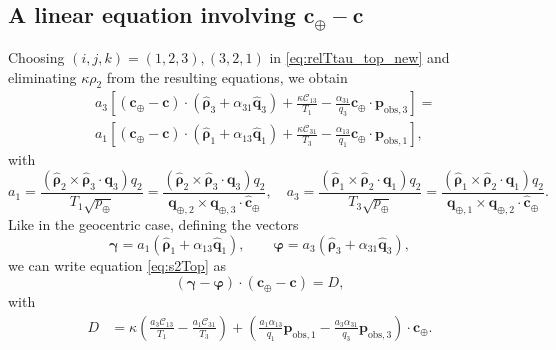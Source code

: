 \documentclass[11pt]{article}
\def\angmom{\bm{c}}
\def\angmom{{\bm{c}}}
\begin{document}
\subsection{A linear equation involving $\angmom_\oplus-\angmom$}

Choosing $(i,j,k)=(1,2,3), (3,2,1)$ in \eqref{eq:relTtau_top_new} and eliminating $\kappa\rho_2$ from the resulting equations, we obtain
\begin{equation}\label{eq:s2Top}
    \begin{aligned}
        & a_3 \left[\left(\bm{c}_\oplus-\bm{c}\right)\cdot
        \left(\hat{\bm{\rho}}_3
        +\alpha_{31}\hat{\bm{q}}_3\right) + \frac{\kappa\mathcal{C}_{13} 
        }{T_1}
        -\frac{\alpha_{31}}{q_3}\bm{c}_\oplus\cdot\bm{p}_{\text{obs},3}
        \right]
        =\\
        & a_1\left[(\bm{c}_\oplus-\bm{c})\cdot
        \left(\hat{\bm{\rho}}_1
        +\alpha_{13}\hat{\bm{q}}_1\right) + \frac{\kappa\mathcal{C}_{31}}{T_3}
        -\frac{\alpha_{13}}{q_1}\bm{c}_\oplus\cdot\bm{p}_{\text{obs},1}
        \right],
    \end{aligned}
\end{equation}
with
\begin{equation}
    a_{1} = \frac{\left(
    \hat{\bm{\rho}}_2\times\hat{\bm{\rho}}_3 \cdot\bm{q}_3
    \right){q}_2}{T_1\sqrt{p_\oplus}}
    = 
    \frac{\left(
    \hat{\bm{\rho}}_2\times\hat{\bm{\rho}}_3 \cdot\bm{q}_3
    \right){q}_2}{\bm{q}_{\oplus,2}\times\bm{q}_{\oplus,3} \cdot\hat{\bm{c}}_\oplus}
    , \quad
    a_{3} = \frac{\left(
    \hat{\bm{\rho}}_1\times\hat{\bm{\rho}}_2 \cdot\bm{q}_1
    \right){q}_2}{T_3\sqrt{p_\oplus}}
    = \frac{\left(
    \hat{\bm{\rho}}_1\times\hat{\bm{\rho}}_2 \cdot\bm{q}_1
    \right){q}_2}{\bm{q}_{\oplus,1}\times\bm{q}_{\oplus,2} \cdot\hat{\bm{c}}_\oplus}.
\label{eq:ajtop}
\end{equation}
%
Like in the geocentric case, defining the vectors
%
\begin{equation*}
    \bm{\gamma} = a_{1}\left(\hat{\bm{\rho}}_1 + \alpha_{13}\hat{\bm{q}}_1\right),\qquad
    \bm{\varphi} = a_{3}\left(\hat{\bm{\rho}}_3 + \alpha_{31}\hat{\bm{q}}_3\right),
\end{equation*}
%
we can write equation \eqref{eq:s2Top} as
%
\begin{equation}\label{eq:slintop}
    (\bm{\gamma}-\bm{\varphi})\cdot\left(\bm{c}_\oplus-\bm{c}\right) = D,
\end{equation}
with
\begin{equation*}
\begin{aligned}
    D &= \kappa\left(\frac{a_3\mathcal{C}_{13}}{T_1} - \frac{a_1\mathcal{C}_{31}}{T_3}\right)
    +\left(
    \frac{a_1\alpha_{13}}{q_1}\bm{p}_{\text{obs},1} 
    -
     \frac{a_3\alpha_{31}}{q_3}\bm{p}_{\text{obs},3} 
    \right) \cdot \bm{c}_\oplus.
\end{aligned}
\end{equation*}
\end{document}
